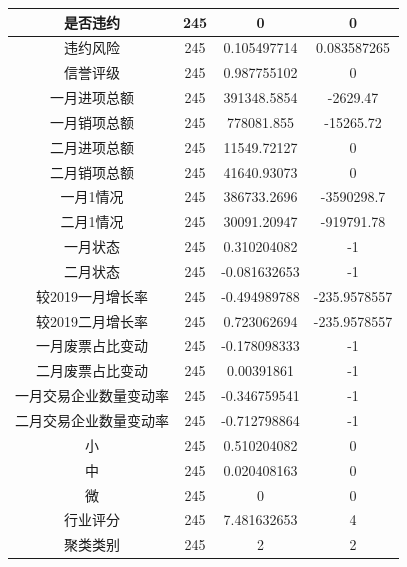 \documentclass[UTF8]{ctexart}
\begin{document}
\begin{center}
\begin{longtable}{|c|c|c|c|}
		是否违约                   & 245  & 0            & 0            \\ \hline
		违约风险                   & 245  & 0.105497714  & 0.083587265  \\ \hline
		信誉评级                   & 245  & 0.987755102  & 0            \\ \hline
		一月进项总额               & 245  & 391348.5854  & -2629.47     \\ \hline
		一月销项总额               & 245  & 778081.855   & -15265.72    \\ \hline
		二月进项总额               & 245  & 11549.72127  & 0            \\ \hline
		二月销项总额               & 245  & 41640.93073  & 0            \\ \hline
		一月1情况                  & 245  & 386733.2696  & -3590298.7   \\ \hline
		二月1情况                  & 245  & 30091.20947  & -919791.78   \\ \hline
		一月状态                   & 245  & 0.310204082  & -1           \\ \hline
		二月状态                   & 245  & -0.081632653 & -1           \\ \hline
		较2019一月增长率           & 245  & -0.494989788 & -235.9578557 \\ \hline
		较2019二月增长率           & 245  & 0.723062694  & -235.9578557 \\ \hline
		一月废票占比变动           & 245  & -0.178098333 & -1           \\ \hline
		二月废票占比变动           & 245  & 0.00391861   & -1           \\ \hline
		一月交易企业数量变动率     & 245  & -0.346759541 & -1           \\ \hline
		二月交易企业数量变动率     & 245  & -0.712798864 & -1           \\ \hline
		小                         & 245  & 0.510204082  & 0            \\ \hline
		中                         & 245  & 0.020408163  & 0            \\ \hline
		微                         & 245  & 0            & 0            \\ \hline
		行业评分                   & 245  & 7.481632653  & 4            \\ \hline
		聚类类别                   & 245  & 2            & 2            \\ \hline
	\end{longtable}
\end{center}
\end{document}
